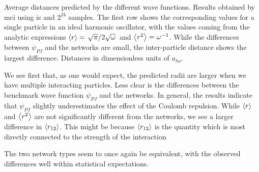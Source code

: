 \documentclass[Thesis.tex]{subfiles}
\begin{document}
\begin{table}[h]
  \centering
  \caption[Radial metrics of different wave functions on quantum dots]{Average distances predicted by the different wave functions. Results
    obtained by \gls{mci} using \gls{is} and $2^{24}$
    samples. The first row shows the corresponding values for a single particle
    in an ideal harmonic oscillator, with the values coming from the analytic
    expressions $\expval{r}=\flatfrac{\sqrt\pi}{2\sqrt\omega}$ and
    $\expval{r^2}=\omega^{-1}$. While the differences between $\psi_{PJ}$ and
    the networks are small, the inter-particle distance shows the largest
    difference. Distances in dimensionless units of $a_{ho}$.}
  
  \label{tab:QD-mean-distance-metrics}
\end{table}
We see first that, as one would expect, the predicted radii are larger when we
have multiple interacting particles. Less clear is the differences between the
benchmark wave function $\psi_{PJ}$ and the networks. In general, the results
indicate that $\psi_{PJ}$ slightly underestimates the effect of the Coulomb
repulsion. While $\expval{r}$ and $\expval{r^2}$ are not significantly different
from the networks, we see a larger difference in $\expval{r_{12}}$. This might
be because $\expval{r_{12}}$ is the quantity which is most directly
connected to the strength of the interaction

The two network types seem to once again be equivalent, with the observed differences well
within statistical expectations.
\end{document}
